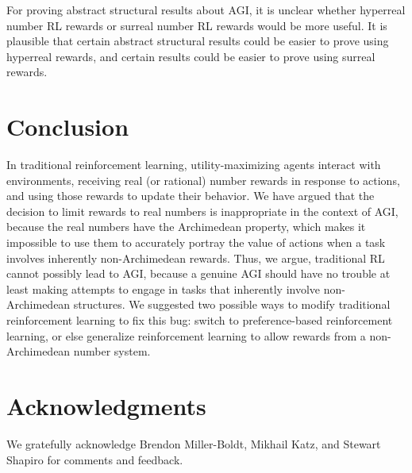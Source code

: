 \documentclass[reqno]{article}
\theoremstyle{definition}
\begin{document}
For proving abstract structural results about AGI, it is unclear
whether hyperreal number RL rewards or surreal number RL rewards would be more
useful. It is plausible that certain abstract structural results could be easier
to prove using hyperreal rewards, and certain results could be easier to
prove using surreal rewards.


\section{Conclusion}
\label{conclusionsection}

In traditional reinforcement learning, utility-maximizing agents interact
with environments, receiving real (or rational) number rewards in response to
actions, and using those rewards to update their behavior. We have argued that
the decision to limit rewards to real numbers is inappropriate in the context
of AGI, because the real numbers have the Archimedean property, which makes it
impossible to use them to accurately portray the value of actions when a task
involves inherently non-Archimedean rewards. Thus, we argue, traditional
RL cannot possibly lead to AGI, because a genuine AGI should have no trouble
at least making attempts to engage in tasks that inherently involve
non-Archimedean structures. We suggested two possible ways
to modify traditional reinforcement learning to fix this bug: switch to
preference-based reinforcement learning, or else generalize reinforcement learning
to allow rewards from a non-Archimedean number system.

\section*{Acknowledgments}

We gratefully acknowledge Brendon Miller-Boldt, Mikhail Katz,
and Stewart Shapiro for comments and feedback.



\end{document}
